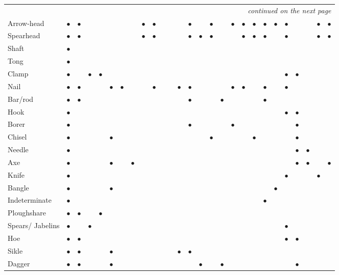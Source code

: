 {{{\begin{longtable}{|l|c|c|c|c|c|c|c|c|c|c|c|c|c|c|c|c|c|c|c|c|c|c|c|c|c|c|}
\hline
\endhead
\hline
\multicolumn{27}{r}{\small\itshape continued on the next page}\\
\endfoot
\endlastfoot
\hline
Arrow-head & $\bullet$ & $\bullet$ & &&&&& $\bullet$ &$\bullet$ &&&& $\bullet$ & & $\bullet$ & & $\bullet$ &$\bullet$ &$\bullet$ &$\bullet$ &$\bullet$ &$\bullet$ &&& $\bullet$ &$\bullet$ \\
Spearhead & $\bullet$ & $\bullet$ &&&&&& $\bullet$ &$\bullet$ &&&& $\bullet$ & $\bullet$ &$\bullet$ & && $\bullet$ &$\bullet$ & $\bullet$  & & $\bullet$ && & $\bullet$& $\bullet$\\
Shaft & $\bullet$&  &&&&&&&&&&&&&&&&&&&&&&&&\\
Tong & $\bullet$ &  &&&&&&&&&&&&&&&&&&&&&&&&\\
Clamp & $\bullet$  & & $\bullet$  & $\bullet$ &&&&&&&&&&&&&&&&& & $\bullet$ & $\bullet$  & & & \\ 
Nail & $\bullet$ & $\bullet$&&&$\bullet$&$\bullet$&&&$\bullet$&&&$\bullet$&$\bullet$&&&&$\bullet$&$\bullet$&&$\bullet$&&$\bullet$&&&&\\
Bar/rod & $\bullet$ & $\bullet$ &&&&&&&&&& & $\bullet$ && &$\bullet$ & &&& $\bullet$ & & &&& & \\
Hook & $\bullet$ & &&&&&&&&&&&&&&&&&& &&$\bullet$ & $\bullet$ & &&\\
Borer & $\bullet$&&&&&&&&&&&&$\bullet$&&&&$\bullet$&&&&&&$\bullet$&&&\\
Chisel &$\bullet$&&&&$\bullet$&&&&&&&&&&$\bullet$&&&&$\bullet$&&&&$\bullet$&&& \\
Needle &$\bullet$&&&&&&&&&&&&&&&&&&&&&&$\bullet$&$\bullet$&& \\
Axe &$\bullet$&&&&$\bullet$&&$\bullet$&&&&&&&&&&&&&&&&$\bullet$&$\bullet$&&$\bullet$ \\
 Knife &$\bullet$&&&&&&&&&&&&&&&&&&&&&$\bullet$&&&$\bullet$& \\
Bangle &$\bullet$&&&&$\bullet$&&&&&&&&&&&&&&&&$\bullet$&&&&& \\
{Indeterminate} &$\bullet$&&&&&&&&&&&&&&&&&&&$\bullet$&&&&&& \\
{Ploughshare} &$\bullet$&$\bullet$&&$\bullet$&&&&&&&&&&&&&&&&&&&&&& \\
{Spears/ Jabelins} &$\bullet$&&$\bullet$&&&&&&&&&&&&&&&&&&&$\bullet$&&&& \\
Hoe &$\bullet$&$\bullet$&&&&&&&&&&&&&&&&&&&&$\bullet$&$\bullet$&&& \\
Sikle &$\bullet$&$\bullet$&&&$\bullet$&&&&&&&$\bullet$&$\bullet$&&&&&&&&&&&&& \\
 Dagger &$\bullet$&$\bullet$&&&$\bullet$&&&&&&&&&$\bullet$&&$\bullet$&&&&&&&$\bullet$&&& \\

\end{longtable}}}}

